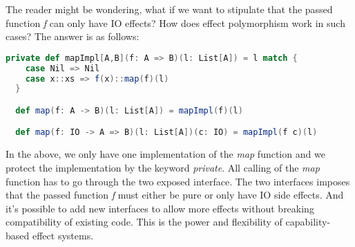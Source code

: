 The reader might be wondering, what if we want to stipulate that the
passed function \emph{f} can only have IO effects? How does effect
polymorphism work in such cases? The answer is as follows:

\begin{lstlisting}[language=Scala]
  private def mapImpl[A,B](f: A => B)(l: List[A]) = l match {
    case Nil => Nil
    case x::xs => f(x)::map(f)(l)
  }

  def map(f: A -> B)(l: List[A]) = mapImpl(f)(l)

  def map(f: IO -> A => B)(l: List[A])(c: IO) = mapImpl(f c)(l)
\end{lstlisting}

In the above, we only have one implementation of the \emph{map}
function and we protect the implementation by the keyword
\emph{private}. All calling of the \emph{map} function has to go
through the two exposed interface. The two interfaces imposes that the
passed function \emph{f} must either be pure or only have IO side
effects. And it's possible to add new interfaces to allow more effects
without breaking compatibility of existing code. This is the power and
flexibility of capability-based effect systems.
